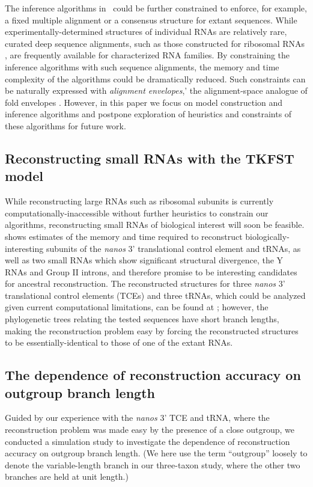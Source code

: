 \documentclass[10pt]{article}
\begin{document}
The inference algorithms in \indiegram\ could be further constrained
to enforce, for example, a fixed multiple alignment or a consensus
structure for extant sequences.  While experimentally-determined
structures of individual RNAs are relatively rare, curated deep sequence
alignments, such as those constructed for ribosomal RNAs
\cite{Gutell93}, are frequently available for characterized RNA families.  By constraining the
inference algorithms with such sequence alignments, the memory and
time complexity of the algorithms could be dramatically reduced.  Such
constraints can be naturally expressed with {\em alignment envelopes},'
the alignment-space analogue of fold envelopes \cite{Holmes2005}.
However, in this paper we focus on model construction and inference
algorithms and postpone exploration of heuristics and constraints of
these algorithms for future work.


\subsection*{Reconstructing small RNAs with the TKFST model}

While reconstructing large RNAs such as ribosomal subunits is
currently computationally-inaccessible without further heuristics to
constrain our algorithms, reconstructing small RNAs of biological
interest will soon be feasible.
 shows estimates of the memory and time required
to reconstruct biologically-interesting subunits of 
the \emph{nanos} 3' translational control element and tRNAs,
as well as two small RNAs which show significant structural
divergence, the Y RNAs and Group II introns, and therefore promise to be
interesting candidates for ancestral reconstruction.
The reconstructed structures for three \emph{nanos} 3'
translational control elements (TCEs) and three tRNAs, which could be
analyzed given current computational limitations, can be found at
\indiegramurl; however, the phylogenetic trees relating the tested
sequences have short branch lengths, making the reconstruction problem easy by forcing the reconstructed structures to
be essentially-identical to those of one of the extant RNAs.


\subsection*{The dependence of reconstruction accuracy on outgroup
  branch length}

Guided by our experience with the \emph{nanos} 3' TCE and tRNA, where
the reconstruction problem was made easy by the presence of a close
outgroup, we conducted a simulation study to investigate the
dependence of reconstruction accuracy on outgroup branch length.
(We here use the term ``outgroup'' loosely to denote the
variable-length branch in our three-taxon study,
where the other two branches are held at unit length.)
\end{document}
